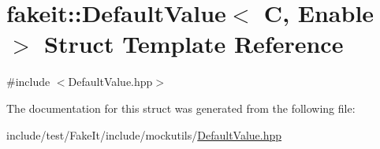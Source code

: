 \hypertarget{structfakeit_1_1DefaultValue}{}\section{fakeit\+::Default\+Value$<$ C, Enable $>$ Struct Template Reference}
\label{structfakeit_1_1DefaultValue}


{\ttfamily \#include $<$Default\+Value.\+hpp$>$}



The documentation for this struct was generated from the following file\+:\begin{DoxyCompactItemize}
\item 
include/test/\+Fake\+It/include/mockutils/\mbox{\hyperlink{DefaultValue_8hpp}{Default\+Value.\+hpp}}\end{DoxyCompactItemize}
